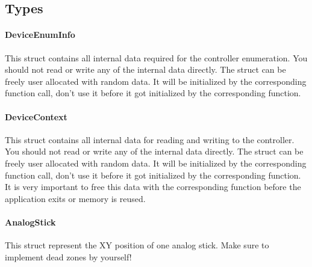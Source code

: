 
\subsection{Types}
\paragraph{DeviceEnumInfo} This struct contains all internal data required for the controller enumeration. You should not read or write any of the internal data directly. The struct can be freely user allocated with random data. It will be initialized by the corresponding function call, don't use it before it got initialized by the corresponding function.

\paragraph{DeviceContext} This struct contains all internal data for reading and writing to the controller. You should not read or write any of the internal data directly. The struct can be freely user allocated with random data. It will be initialized by the corresponding function call, don't use it before it got initialized by the corresponding function. It is very important to free this data with the corresponding function before the application exits or memory is reused. 

\label{APIRef_Types_analstick}
\paragraph{AnalogStick} This struct represent the XY position of one analog stick. Make sure to implement dead zones by yourself! \\

 \\

 \\

\label{APIRef_Types_vec3}
